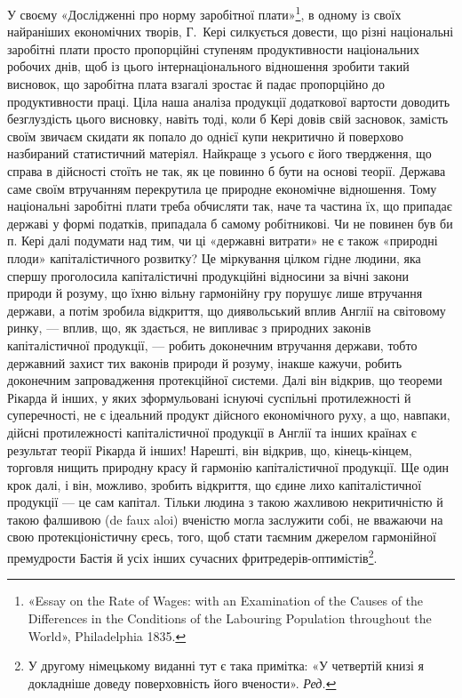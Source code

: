 У своєму «Дослідженні про норму заробітної плати»\footnote{
«Essay on the Rate of Wages: with an Examination of the Causes
of the Differences in the Conditions of the Labouring Population throughout
the World», Philadelphia 1835.
}, в одному із своїх найраніших економічних
творів, Г.~Кері силкується
довести, що різні національні заробітні плати просто пропорційні
ступеням продуктивности національних робочих днів,
щоб із цього інтернаціонального відношення зробити такий висновок,
що заробітна плата взагалі зростає й падає пропорційно
до продуктивности праці. Ціла наша аналіза продукції додаткової
вартости доводить безглуздість цього висновку, навіть тоді,
коли б Кері довів свій засновок, замість своїм звичаєм скидати
як попало до однієї купи некритично й поверхово назбираний
статистичний матеріял. Найкраще з усього є його твердження,
що справа в дійсності стоїть не так, як це повинно б бути на
основі теорії. Держава саме своїм втручанням перекрутила це природне
економічне відношення. Тому національні заробітні плати
треба обчисляти так, наче та частина їх, що припадає державі
у формі податків, припадала б самому робітникові. Чи не повинен
був би п. Кері далі подумати над тим, чи ці «державні витрати»
не є також «природні плоди» капіталістичного розвитку? Це міркування
цілком гідне людини, яка спершу проголосила капіталістичні
продукційні відносини за вічні закони природи й розуму,
що їхню вільну гармонійну гру порушує лише втручання держави,
а потім зробила відкриття, що диявольський вплив Англії
на світовому ринку, — вплив, що, як здається, не випливає з
природних законів капіталістичної продукції, — робить доконечним
втручання держави, тобто державний захист тих ваконів
природи й розуму, інакше кажучи, робить доконечним запровадження
протекційної системи. Далі він відкрив, що теореми
Рікарда й інших, у яких зформульовані існуючі суспільні протилежності
й суперечності, не є ідеальний продукт дійсного економічного
руху, а що, навпаки, дійсні протилежності капіталістичної
продукції в Англії та інших країнах є результат теорії
Рікарда й інших! Нарешті, він відкрив, що, кінець-кінцем,
торговля нищить природну красу й гармонію капіталістичної
продукції. Ще один крок далі, і він, можливо, зробить відкриття,
що єдине лихо капіталістичної продукції — це сам капітал.
Тільки людина з такою жахливою некритичністю й такою фалшивою
(de faux aloi) вченістю могла заслужити собі, не вважаючи
на свою протекціоністичну єресь, того, щоб стати таємним джерелом
гармонійної премудрости Бастія й усіх інших сучасних
фритредерів-оптимістів\footnote*{
У другому німецькому виданні тут є така примітка: «У четвертій
книзі я докладніше доведу поверховність його вчености». \emph{Ред.}
}.
